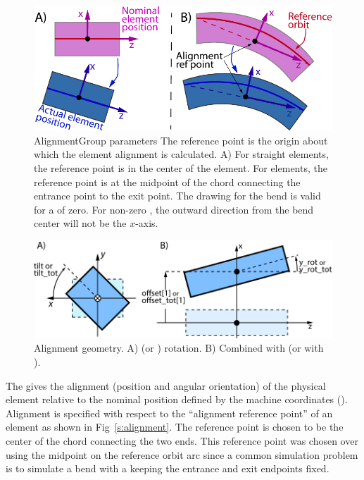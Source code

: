 \begin{figure}[bt]
\centering \includegraphics{alignment-ref.pdf} 
\caption[Element alignment.]  
{AlignmentGroup parameters The reference point is the origin
about which the element alignment is calculated. 
A) For straight elements, the reference point is in the center of the element. 
For  elements, the reference point is at the midpoint of the chord connecting
the entrance point to the exit point. The drawing for the bend is valid for a 
of zero. For non-zero , the outward direction from the bend center will not be
the $x$-axis. 
}  \label{f:alignment}
\end{figure}

\begin{figure}
\centering \includegraphics{alignment2.pdf} \caption[Alignment geometry.]  
{Alignment geometry. A)  (or ) rotation. B) Combined
 with  (or  with ).
}  \label{f:alignment}
\end{figure}

The  gives the alignment (position and angular orientation) of the physical element 
relative to the nominal position defined by the machine coordinates ().
Alignment is specified with respect to the ``alignment reference point'' of an element as shown
in Fig~\ref{s:alignment}. The  reference point is chosen to be the center of the chord
connecting the two ends. 
This reference point was chosen over using the midpoint on the reference orbit arc since a 
common simulation problem is to simulate a bend with a  keeping the entrance and exit
endpoints fixed.

